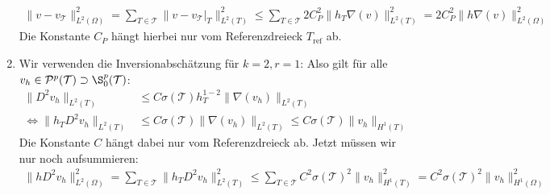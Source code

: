 \begin{solution}
\begin{enumerate}[label = \textbf{\alph*)}]
\begin{align*}
    \|v - v_{\mathcal{T}}\|_{L^2(\Omega)}^2 = \sum_{T \in \mathcal{T}}\|v-v_{\mathcal{T}}|_T\|_{L^2(T)}^2
    \leq \sum_{T \in \mathcal{T}}2C_P^2\|h_T \nabla(v)\|_{L^2(T)}^2 = 2C_P^2\|h\nabla(v)\|_{L^2(\Omega)}^2
  \end{align*}
  Die Konstante $C_P$ hängt hierbei nur vom Referenzdreieck $T_{\mathrm{ref}}$ ab.
  \item Wir verwenden die Inversionabschätzung für $k = 2, r = 1$: Also gilt für alle
 $v_h \in \mathcal{P}^p(\mathcal{T}) \supset \S_0^p(\mathcal{T})$:
  \begin{align*}
    \|D^2v_h\|_{L^2(T)} &\leq C\sigma(\mathcal{T})h_T^{1-2}\|\nabla(v_h)\|_{L^2(T)} \\
    \iff \|h_TD^2v_h\|_{L^2(T)} &\leq C\sigma(\mathcal{T})\|\nabla(v_h)\|_{L^2(T)}
    \leq C\sigma(\mathcal{T})\|v_h\|_{H^1(T)}
  \end{align*}
  Die Konstante $C$ hängt dabei nur vom Referenzdreieck ab. Jetzt müssen wir nur
  noch aufsummieren:
  \begin{align*}
    \|hD^2v_h\|_{L^2(\Omega)}^2 = \sum_{T \in \mathcal{T}}\|h_TD^2v_h\|_{L^2(T)}^2
    \leq \sum_{T \in \mathcal{T}}C^2\sigma(\mathcal{T})^2\|v_h\|_{H^1(T)}^2
    = C^2\sigma(\mathcal{T})^2\|v_h\|_{H^1(\Omega)}^2
  \end{align*}

\end{enumerate}



\end{solution}

